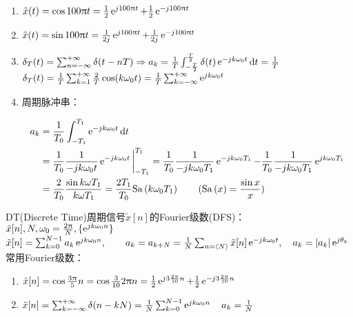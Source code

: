\documentclass{article}
\newcommand\Sa[1]{\mathrm{Sa}\left(#1\right)}
\begin{document}
\begin{enumerate}[label=(\arabic*)]
	\item $\tilde{x}(t) = \cos 100\uppi t = \frac{1}{2}\operatorname{e}^{j 100\uppi t}+\frac{1}{2}\operatorname{e}^{-j 100\uppi t}$
	\item $\tilde{x}(t) = \sin 100\uppi t = \frac{1}{2j}\operatorname{e}^{j 100\uppi t}+\frac{1}{2j}\operatorname{e}^{-j 100\uppi t}$
	\item $\delta_{T}(t) = \sum_{n=-\infty}^{+\infty}\delta(t-nT)\Rightarrow a_{k} = \frac{1}{T}\int_{-\frac{T}{2}}^{\frac{T}{2}}\delta(t)\operatorname{e}^{-jk\omega_0 t}\mathop{}\!\mathrm{d} t = \frac{1}{T}$\\
				$\delta_T(t) = \frac{1}{T}\sum_{k=1}^{+\infty}\frac{2}{T}\cos(k\omega_0t) = \frac{1}{T}\sum_{k=-\infty}^{+\infty}\operatorname{e}^{jk\omega_0 t}$
	\item 周期脉冲串：
				\begin{figure}[H]
						\centering
				\end{figure}
				\[\begin{aligned}
					a_{k} &= \frac{1}{T_0}\int_{-T_1}^{T_1}\e^{-jk\omega_0 t}\dif t\\
					&= \frac{1}{T_0}\frac{1}{-jk\omega_0 t}\e^{-jk\omega_0 t}\bigg|_{-T_1}^{T_1} = \frac{1}{T_0}\frac{1}{-jk\omega_0 T_1}\e^{-jk\omega_0 T_1}-\frac{1}{T_0}\frac{1}{-jk\omega_0 T_1}\e^{jk\omega_0 T_1}\\
					&= \frac{2}{T_0}\frac{\sin k\omega T_1}{k\omega T_1} = \frac{2T_1}{T_0}\Sa{k\omega_0 T_1}\qquad (\Sa{x} = \frac{\sin x}{x})
				\end{aligned}\]
\end{enumerate}

DT(Discrete Time)周期信号$\tilde{x}[n]$的Fourier级数(DFS)：\\
$\tilde{x}[n],N,\omega_0=\frac{2\uppi}{N},\{\operatorname{e}^{jk\omega_0 n}\}$\\
$\tilde{x}[n] = \sum_{k=0}^{N-1}a_{k}\operatorname{e}^{jk\omega_0 n},\qquad a_{k}=a_{k+N} = \frac{1}{N}\sum_{n=\langle N\rangle}\tilde{x}[n]\operatorname{e}^{-jk\omega_0 t},\quad a_{k}=|a_{k}|\operatorname{e}^{j\theta_k}$\\
常用Fourier级数：\begin{enumerate}[label=(\arabic*)]
	\item $\tilde{x}[n] = \cos \frac{3\uppi}{5}n =\cos \frac{3}{10}2\uppi n = \frac{1}{2}\operatorname{e}^{j3\frac{2\uppi}{10}n} + \frac{1}{2}\operatorname{e}^{-j3 \frac{2\uppi}{10}n}$
	\item $\tilde{x}[n] = \sum_{k=-\infty}^{+\infty}\delta(n-kN) = \frac{1}{N}\sum_{k=0}^{N-1}\operatorname{e}^{jk\omega_0 n}\quad a_{k}=\frac{1}{N}$
\end{enumerate}
\end{document}
